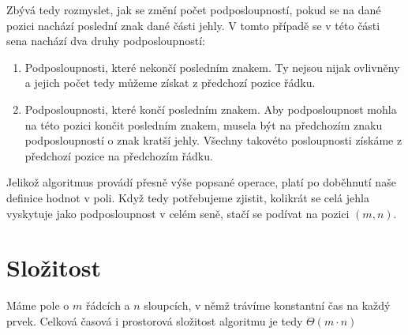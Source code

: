 \documentclass{scrartcl}
\begin{document}
    Zbývá tedy rozmyslet, jak se změní počet podposloupností, pokud se na dané pozici nachází poslední znak dané části jehly. V tomto případě se v této části sena nachází dva druhy podposloupností:

    \begin{enumerate}
        \item Podposloupnosti, které nekončí posledním znakem. Ty nejsou nijak ovlivněny a jejich počet tedy můžeme získat z předchozí pozice řádku. 
        \item Podposloupnosti, které končí posledním znakem. Aby podposloupnost mohla na této pozici končit posledním znakem, musela být na předchozím znaku podposloupností o znak kratší jehly. Všechny takovéto posloupnosti získáme z předchozí pozice na předchozím řádku.
    \end{enumerate}

    Jelikož algoritmus provádí přesně výše popsané operace, platí po doběhnutí naše definice hodnot v poli. Když tedy potřebujeme zjistit, kolikrát se celá jehla vyskytuje jako podposloupnost v celém seně, stačí se podívat na pozici $(m, n)$.

    \section{Složitost}
    Máme pole o $m$ řádcích a $n$ sloupcích, v němž trávíme konstantní čas na každý prvek. Celková časová i prostorová složitost algoritmu je tedy $\Theta (m \cdot n)$
    
    
\end{document}
